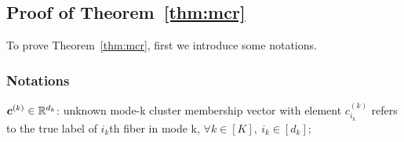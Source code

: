 \documentclass{article}
\begin{document}
\begin{appendices}


\subsection{Proof of Theorem~\ref{thm:mcr}}
To prove Theorem~\ref{thm:mcr}, first we introduce some notations.
\subsubsection{Notations}
$\boldsymbol{c}^{(k)}\in \mathbb{R}^{d_k}$: unknown mode-k cluster membership vector with element $c^{(k)}_{i_k}$ refers to the true label of $i_k$th fiber in mode k, $\forall k\in[K],~i_k\in[d_k]$;


\end{appendices}
\end{document}
